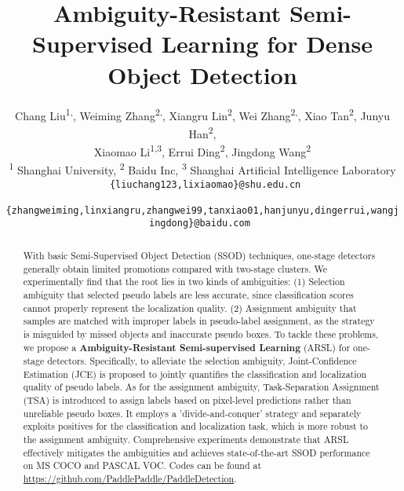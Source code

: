 \documentclass[10pt,twocolumn,letterpaper]{article}
\begin{document}
\title{Ambiguity-Resistant Semi-Supervised Learning for Dense Object Detection}

\author{
Chang Liu\textsuperscript{1,}\footnotemark[1] , Weiming Zhang\textsuperscript{2,}\footnotemark[1] , Xiangru Lin\textsuperscript{2},
Wei Zhang\textsuperscript{2,}\footnotemark[2] , Xiao Tan\textsuperscript{2}, 
Junyu Han\textsuperscript{2}, \\
Xiaomao Li\textsuperscript{1,3},
Errui Ding\textsuperscript{2},
Jingdong Wang\textsuperscript{2} \\
\textsuperscript{1} Shanghai University,
\textsuperscript{2} Baidu Inc,
\textsuperscript{3} Shanghai Artificial Intelligence Laboratory \\
\tt\small 
\{liuchang123,lixiaomao\}@shu.edu.cn \\
\tt\small 
\{zhangweiming,linxiangru,zhangwei99,tanxiao01,hanjunyu,dingerrui,wangjingdong\}@baidu.com
}

\maketitle
\renewcommand{\thefootnote}{\fnsymbol{footnote}}


\begin{abstract}
With basic Semi-Supervised Object Detection (SSOD) techniques, one-stage detectors generally obtain limited promotions compared with two-stage clusters.
We experimentally find that the root lies in two kinds of ambiguities: 
(1) Selection ambiguity that selected pseudo labels are less accurate, since classification scores cannot properly represent the localization quality. 
(2) Assignment ambiguity that samples are matched with improper labels in pseudo-label assignment, as the strategy is misguided by missed objects and inaccurate pseudo boxes.
To tackle these problems, we propose a \textbf{Ambiguity-Resistant Semi-supervised Learning} (ARSL) for one-stage detectors.
Specifically, to alleviate the selection ambiguity, Joint-Confidence Estimation (JCE) is proposed to jointly quantifies the classification and localization quality of pseudo labels.
As for the assignment ambiguity, Task-Separation Assignment (TSA) is introduced to assign labels based on pixel-level predictions rather than unreliable pseudo boxes.
It employs a ’divide-and-conquer’ strategy and separately exploits positives for the classification and localization task, which is more robust to the assignment ambiguity.
Comprehensive experiments demonstrate that ARSL effectively mitigates the ambiguities and achieves state-of-the-art SSOD performance on MS COCO and PASCAL VOC.
Codes can be found at \href{https://github.com/PaddlePaddle/PaddleDetection}{https://github.com/PaddlePaddle/PaddleDetection}.
\end{abstract}
\end{document}
